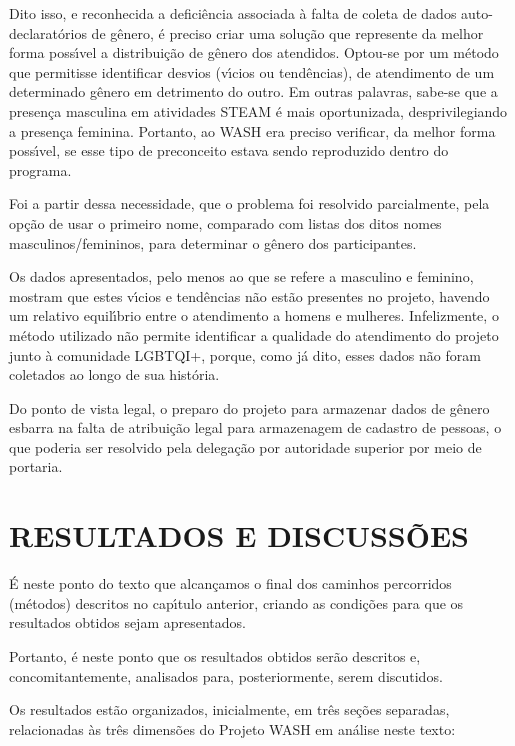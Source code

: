 \documentclass[
12pt,		%
openright,	%
twoside,  %
a4paper,			%
chapter=TITLE,		%
english,			%
french,				%
spanish,			%
brazil				%
]{USPSC-classe/USPSC}
\begin{document}
Dito isso, e reconhecida a defici\^encia associada \`a falta de coleta de dados auto-declarat\'orios de g\^enero, \'e preciso criar uma solu\c{c}\~ao que represente da melhor forma poss\'{\i}vel a distribui\c{c}\~ao de g\^enero dos atendidos. Optou-se por um m\'etodo que permitisse identificar desvios (v\'{\i}cios ou tend\^encias), de atendimento de um determinado g\^enero em detrimento do outro. Em outras palavras, sabe-se que a presen\c{c}a masculina em atividades STEAM \'e mais oportunizada, desprivilegiando a presen\c{c}a feminina. Portanto, ao WASH era preciso verificar, da melhor forma poss\'{\i}vel, se esse tipo de preconceito estava sendo reproduzido dentro do programa.


Foi a partir dessa necessidade, que o problema foi resolvido parcialmente, pela op\c{c}\~ao de usar o primeiro nome, comparado com listas dos ditos nomes masculinos/femininos, para determinar o g\^enero dos participantes.


Os dados apresentados, pelo menos ao que se refere a masculino e feminino, mostram que estes v\'{\i}cios e tend\^encias n\~ao est\~ao presentes no projeto, havendo um relativo equil\'{\i}brio entre o atendimento a homens e mulheres. Infelizmente, o m\'etodo utilizado n\~ao permite identificar a qualidade do atendimento do projeto junto \`a comunidade LGBTQI+, porque, como j\'a dito, esses dados n\~ao foram coletados ao longo de sua hist\'oria.


Do ponto de vista legal, o preparo do projeto para armazenar dados de g\^enero esbarra na falta de atribui\c{c}\~ao legal para armazenagem de cadastro de pessoas, o que poderia ser resolvido pela delega\c{c}\~ao por autoridade superior por meio de portaria.


\chapter[RESULTADOS E DISCUSS\~OES]{RESULTADOS E DISCUSS\~OES}\label{RESULTADOS E DISCUSS\~OES}
\'E neste ponto do texto que alcan\c{c}amos o final dos caminhos percorridos (m\'etodos) descritos no cap\'{\i}tulo anterior, criando as condi\c{c}\~oes para que os resultados obtidos sejam apresentados.


Portanto, \'e neste ponto que os resultados obtidos ser\~ao descritos e, concomitantemente, analisados para, posteriormente, serem discutidos.


Os resultados est\~ao organizados, inicialmente, em tr\^es se\c{c}\~oes separadas, relacionadas \`as tr\^es dimens\~oes do Projeto WASH em an\'alise neste texto:
\end{document}
